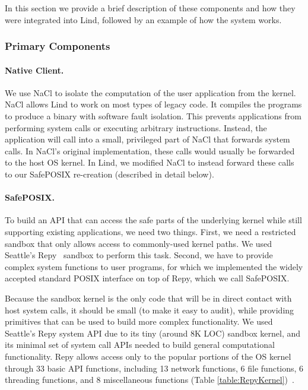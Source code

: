 In this section we provide a brief description of these components and how they
were integrated into Lind, followed by an example of how the system works.

\subsubsection{Primary Components}

\paragraph{Native Client.}
We use NaCl to isolate the computation of the user application
from the kernel. NaCl allows Lind to work on most types of legacy code.
It compiles the programs to produce a binary with software fault isolation.
This prevents applications from performing system calls
or executing arbitrary instructions.
Instead, the application will call into a small, privileged
part of NaCl that forwards system calls. In NaCl's original implementation,
these calls would usually be forwarded to the host OS kernel. In Lind, we
modified NaCl to instead forward these calls to our SafePOSIX re-creation 
(described in detail below).

\paragraph{SafePOSIX.}

To build an API that can access the safe parts of the underlying kernel while
still supporting existing applications, we need two things. First, we need a
restricted sandbox that only allows access to commonly-used kernel paths. We
used Seattle's Repy~\cite{Repy-10} sandbox to perform this task. Second, we
have to provide complex system functions to user programs,
for which we implemented the widely accepted standard POSIX interface on top of Repy, 
which we call SafePOSIX. 

Because the sandbox kernel is the only code that will be in direct contact with host
system calls, it should be small (to make it easy to audit), while providing
primitives that can be used to build more complex functionality.
We used Seattle's Repy system API due to its tiny (around 8K LOC) sandbox
kernel, and its minimal set of system call APIs needed to build general
computational functionality. Repy allows access only to the popular portions of
the OS kernel through 33 basic API functions, including 13 network functions, 6
file functions, 6 threading functions, and 8 miscellaneous functions (Table
\ref{table:RepyKernel})~\cite{Repy-10, RepyKernel}.

